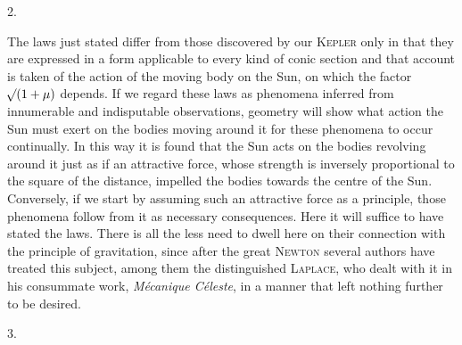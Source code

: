 \par{}
\begin{center}
2.
\end{center}
The laws just stated differ from those discovered by our \textsc{Kepler} only in that they are expressed in a form applicable to every kind of conic section and that account is taken of the action of the moving body on the Sun, on which the factor $\mathord{{}^{}\!\surd}(1+\mu)$ depends. If we regard these laws as phenomena inferred from innumerable and indisputable observations, geometry will show what action
the Sun must exert on the bodies moving around it for these phenomena to occur continually. In this way it is found that the Sun acts on the bodies revolving around it just as if an attractive force, whose strength is inversely proportional to the square of the distance, impelled the bodies towards the centre of the Sun. Conversely, if we start by assuming such an attractive force as a principle, those phenomena follow from it as necessary consequences. Here it will suffice to have stated the laws. There is all the less need to dwell here on their connection with the principle of gravitation, since after the great \textsc{Newton} several authors have treated this subject, among them the distinguished \textsc{Laplace}, who dealt with it in his consummate work, \textit{Mécanique Céleste}, in a manner that left nothing further to be desired.

\begin{center}
3.
\end{center}

